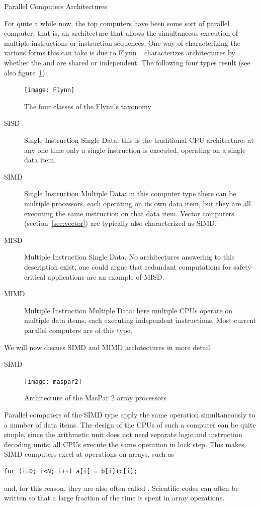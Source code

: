 
 {Parallel Computers Architectures}

For quite a while now, the top computers have been
some sort of parallel computer, that is, an architecture that allows
the simultaneous execution of multiple instructions or instruction
sequences. One way of characterizing the various forms this can take
is due to Flynn~\cite{flynn:taxonomy}.  
characterizes architectures by whether the 
and  are shared or independent.
The following four types result (see also figure~\ref{fig:flynn}):
\begin{figure}[t]
  \texttt{[image: Flynn]}
  \caption{The four classes of the Flynn's taxonomy}
  \label{fig:flynn}
\end{figure}
\begin{description}
\item[SISD] Single Instruction Single Data: this is the traditional
  CPU architecture: at any one time only a single instruction is
  executed, operating on a single data item.
\item[SIMD] Single Instruction Multiple Data: in this computer type
  there can be multiple processors, each operating on its own data
  item, but they are all executing the same instruction on that data
  item. Vector computers (section~\ref{sec:vector}) are typically also
  characterized as SIMD.
\item[MISD] Multiple Instruction Single Data. No architectures
  answering to this description exist; one could argue that
  redundant computations for safety-critical applications are an
  example of MISD.
\item[MIMD] Multiple Instruction Multiple Data: here multiple CPUs
  operate on multiple data items, each executing independent
  instructions. Most current parallel computers are of this
  type.
\end{description}

We will now discuss SIMD and MIMD architectures in more detail.

 {SIMD}
\label{sec:simd}

\begin{lulu}
  \begin{figure}
    \texttt{[image: maspar2]}
    \caption{Architecture of the MasPar 2 array processors}
    \label{fig:maspar}
  \end{figure}
\end{lulu}
%
Parallel computers of the SIMD type apply the same operation
simultaneously to a number of data items. The design of the CPUs of
such a computer can be quite simple, since the arithmetic unit does
not need separate logic and instruction decoding units: all CPUs
execute the same operation in lock step. 
This makes SIMD computers excel at operations on arrays, such as
%
\begin{verbatim}
for (i=0; i<N; i++) a[i] = b[i]+c[i];
\end{verbatim}
and, for this reason, they are also often called . Scientific codes can often be written so that
a large fraction of the time is spent in array operations.

